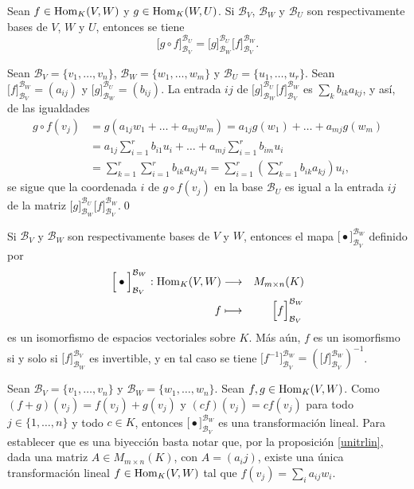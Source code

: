 \begin{pro}\label{compmult}
Sean $f\in\operatorname{Hom}_K(V,W)$ y $g\in\operatorname{Hom}_K(W,U)$. Si $\mathcal{B}_V$, $\mathcal{B}_W$ y $\mathcal{B}_U$ son respectivamente bases de $V$, $W$ y $U$, entonces se tiene
$$
\Big[ g\circ f \Big]^{\mathcal{B}_U}_{\mathcal{B}_V}=\Big[ g \Big]^{\mathcal{B}_U}_{\mathcal{B}_W}\Big[ f \Big]^{\mathcal{B}_W}_{\mathcal{B}_V}.
$$
\end{pro}

\dem Sean $\mathcal{B}_V=\{v_1,\ldots,v_n\}$, $\mathcal{B}_W=\{w_1,\ldots,w_m\}$ y $\mathcal{B}_U=\{u_1,\ldots,u_r\}$. Sean $\Big[ f \Big]^{\mathcal{B}_W}_{\mathcal{B}_V}=(a_{ij})$ y $\Big[ g \Big]^{\mathcal{B}_U}_{\mathcal{B}_W}=(b_{ij})$.
La entrada $ij$ de $\Big[ g \Big]^{\mathcal{B}_U}_{\mathcal{B}_W}\Big[ f \Big]^{\mathcal{B}_W}_{\mathcal{B}_V}$ es $\sum_k b_{ik}a_{kj}$, y as\'i, de las igualdades
\begin{align*}
g\circ f(v_j) &= g(a_{1j}w_1+\ldots+a_{mj}w_m)=a_{1j}g(w_1)+\ldots+a_{mj}g(w_m)\\
 & = a_{1j}\sum_{i=1}^rb_{i1}u_i+\ldots+a_{mj}\sum_{i=1}^rb_{im}u_i\\
 & = \sum_{k=1}^r\sum_{i=1}^rb_{ik}a_{kj}u_i=\sum_{i=1}^r\left(\sum_{k=1}^r b_{ik}a_{kj}\right)u_i,
\end{align*}
se sigue que la coordenada $i$ de $g\circ f(v_j)$ en la base $\mathcal{B}_U$ es igual a la entrada $ij$ de la matriz $\Big[ g \Big]^{\mathcal{B}_U}_{\mathcal{B}_W}\Big[ f \Big]^{\mathcal{B}_W}_{\mathcal{B}_V}$.\qed

\begin{prop}\label{homym}
Si $\mathcal{B}_V$ y $\mathcal{B}_W$ son respectivamente bases de $V$ y $W$, entonces el mapa $\Big[ \bullet \Big]^{\mathcal{B}_W}_{\mathcal{B}_V}$ definido por
\begin{eqnarray*}
\Big[ \bullet \Big]^{\mathcal{B}_W}_{\mathcal{B}_V}: \operatorname{Hom}_K(V,W) & \longrightarrow & M_{m\times n}(K)\\
f & \longmapsto & \Big[ f \Big]^{\mathcal{B}_W}_{\mathcal{B}_V}
\end{eqnarray*}
es un isomorfismo de espacios vectoriales sobre $K$. M\'as a\'un, $f$ es un isomorfismo si y solo si $\Big[ f \Big]_{\mathcal{B}_W}^{\mathcal{B}_V}$ es invertible, y en tal caso se tiene $\Big[ f^{-1} \Big]^{\mathcal{B}_W}_{\mathcal{B}_V}=\left(\Big[ f \Big]_{\mathcal{B}_V}^{\mathcal{B}_W}\right)^{-1}$.
\end{prop}

\dem  Sean $\mathcal{B}_V=\{v_1,\ldots,v_n\}$ y $\mathcal{B}_W=\{w_1,\ldots,w_n\}$. Sean $f,g\in\operatorname{Hom}_K(V,W)$. Como $(f+g)(v_j)=f(v_j)+g(v_j)$ y $(cf)(v_j)=cf(v_j)$ para todo $j\in\{1,\ldots,n\}$ y todo $c\in K$, entonces  $\Big[ \bullet \Big]^{\mathcal{B}_W}_{\mathcal{B}_V}$ es una transformaci\'on lineal. Para establecer que es una biyecci\'on basta notar que, por la proposici\'on \ref{unitrlin}, dada una matriz $A\in M_{m\times n}(K)$, con $A=(a_ij)$, existe una \'unica transformaci\'on lineal $f\in \operatorname{Hom}_K(V,W)$ tal que $f(v_j)=\sum_i a_{ij}w_i$.

